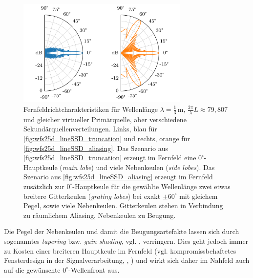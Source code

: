\begin{figure}[t]
\centering
\begin{plotfigures}
\includegraphics[width=85mm]{../python/wfs25d_lineSSD_polar_plot_overlay.png}
\end{plotfigures}
\caption{
Fernfeldrichtcharakteristiken für
Wellenlänge $\lambda=\frac{1}{3}$\,m, $\frac{2\pi}{\lambda} L \approx 79{,}807$
und gleicher virtueller Primärquelle, aber
verschiedene Sekundärquellenverteilungen.
Links, blau für \Abb\ref{fig:wfs25d_lineSSD_truncation} und
rechts, orange für \Abb\ref{fig:wfs25d_lineSSD_aliasing}.
%
Das Szenario aus \Abb\ref{fig:wfs25d_lineSSD_truncation} erzeugt im Fernfeld
eine $0^\circ$-Hauptkeule
(\textit{main lobe})
und viele Nebenkeulen
(\textit{side lobes}).
%
Das Szenario aus \Abb\ref{fig:wfs25d_lineSSD_aliasing} erzeugt im Fernfeld zusätzlich
zur $0^\circ$-Hauptkeule für die gewählte Wellenlänge zwei etwas breitere
Gitterkeulen (\textit{grating lobes})
bei exakt $\pm 60^\circ$ mit gleichem Pegel, sowie viele Nebenkeulen.
%
Gitterkeulen stehen in Verbindung zu räumlichem Aliasing, Nebenkeulen zu Beugung.
%
\cc
}
\label{fig:wfs25d_lineSSD_polar_plot_overlay}
\end{figure}
%
Die Pegel der Nebenkeulen und damit die Beugungsartefakte lassen sich durch
sogenanntes \textit{tapering} bzw. \textit{gain shading},
vgl. \cite{Vogel1993_diss,Start1997_diss}, verringern.
%
Dies geht jedoch immer zu Kosten einer breiteren Hauptkeule
im Fernfeld (vgl. kompromissbehaftetes Fensterdesign in der Signalverarbeitung,
\cite[Kap.~3.5]{Moeser2015_book}, \cite{Kammeyer2022_book}) und wirkt sich
daher im Nahfeld auch auf die gewünschte $0^\circ$-Wellenfront aus.



